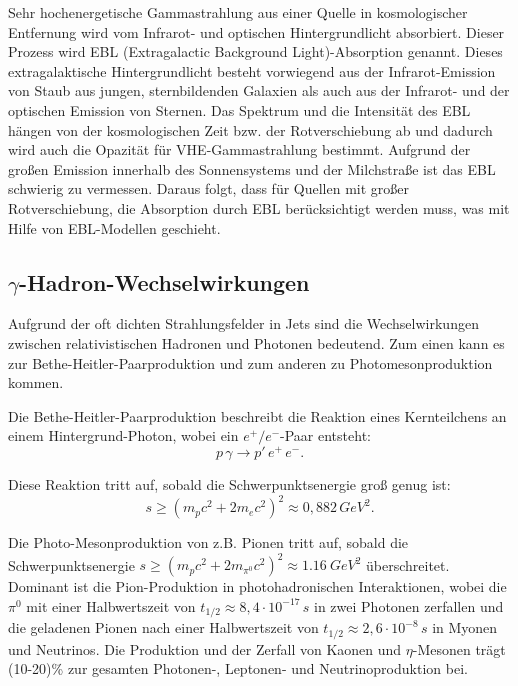 Sehr hochenergetische Gammastrahlung aus einer Quelle in kosmologischer Entfernung wird vom Infrarot- und optischen Hintergrundlicht absorbiert. 
Dieser Prozess wird EBL (Extragalactic Background Light)-Absorption genannt. 
Dieses extragalaktische Hintergrundlicht besteht vorwiegend aus der Infrarot-Emission von Staub aus jungen, sternbildenden Galaxien als auch aus der Infrarot- und der optischen Emission von Sternen.
Das Spektrum und die Intensität des EBL hängen von der kosmologischen Zeit bzw. der Rotverschiebung ab und dadurch wird auch die Opazität für VHE-Gammastrahlung bestimmt.
Aufgrund der großen Emission innerhalb des Sonnensystems und der Milchstraße ist das EBL schwierig zu vermessen.
Daraus folgt, dass für Quellen mit großer Rotverschiebung, die Absorption durch EBL berücksichtigt werden muss, was mit Hilfe von EBL-Modellen geschieht.\cite{RelativisticJets}


\subsection{$\gamma$-Hadron-Wechselwirkungen}
Aufgrund der oft dichten Strahlungsfelder in Jets sind die Wechselwirkungen zwischen relativistischen Hadronen und Photonen bedeutend.
Zum einen kann es zur Bethe-Heitler-Paarproduktion und zum anderen zu Photomesonproduktion kommen.\cite{RelativisticJets}

Die Bethe-Heitler-Paarproduktion beschreibt die Reaktion eines Kernteilchens an einem Hintergrund-Photon, wobei ein $e^+/e^-$-Paar entsteht:
\begin{equation}
 p \, \gamma \rightarrow p' \, e^+ \, e^-.
\end{equation}

Diese Reaktion tritt auf, sobald die Schwerpunktsenergie groß genug ist:
\begin{equation}
 s \geq (m_p c^2 +2 m_e c^2)^2 \approx 0,882\, \si{GeV^2}.
\end{equation}

Die Photo-Mesonproduktion von z.B. Pionen tritt auf, sobald die Schwerpunktsenergie $s \geq (m_p c^2 +2 m_{\pi^0} c^2)^2 \approx \SI{1,16}{GeV^2}$ überschreitet.
Dominant ist die Pion-Produktion in photohadronischen Interaktionen, wobei die $\pi^0$ mit einer Halbwertszeit von $t_{1/2}\approx 8,4\cdot 10^{-17}\,\si{s}$ in zwei Photonen zerfallen und die geladenen Pionen nach einer Halbwertszeit von $t_{1/2}\approx 2,6\cdot 10^{-8}\,\si{s}$ in Myonen und Neutrinos.
Die Produktion und der Zerfall von Kaonen und $\eta$-Mesonen trägt (10-20)\% zur gesamten Photonen-, Leptonen- und Neutrinoproduktion bei.\cite{RelativisticJets}

